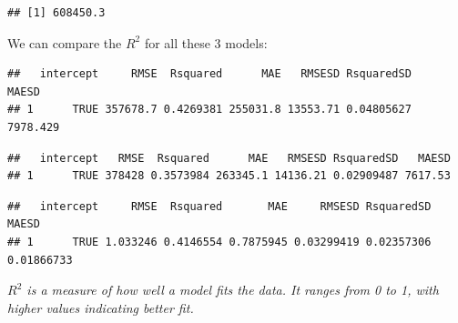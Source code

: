 \documentclass[
]{book}
\newenvironment{Shaded}{\begin{snugshade}}{\end{snugshade}}
\newcommand{\NormalTok}[1]{#1}
\newcommand{\SpecialCharTok}[1]{\textcolor[rgb]{0.81,0.36,0.00}{\textbf{#1}}}
\begin{document}
\begin{verbatim}
## [1] 608450.3
\end{verbatim}

We can compare the \(R^2\) for all these 3 models:

\begin{Shaded}
\end{Shaded}

\begin{verbatim}
##   intercept     RMSE  Rsquared      MAE   RMSESD RsquaredSD    MAESD
## 1      TRUE 357678.7 0.4269381 255031.8 13553.71 0.04805627 7978.429
\end{verbatim}

\begin{Shaded}
\end{Shaded}

\begin{verbatim}
##   intercept   RMSE  Rsquared      MAE   RMSESD RsquaredSD   MAESD
## 1      TRUE 378428 0.3573984 263345.1 14136.21 0.02909487 7617.53
\end{verbatim}

\begin{Shaded}
\end{Shaded}

\begin{verbatim}
##   intercept     RMSE  Rsquared       MAE     RMSESD RsquaredSD      MAESD
## 1      TRUE 1.033246 0.4146554 0.7875945 0.03299419 0.02357306 0.01866733
\end{verbatim}

\emph{\(R^2\) is a measure of how well a model fits the data. It ranges from 0 to 1, with higher values indicating better fit.}
\end{document}
